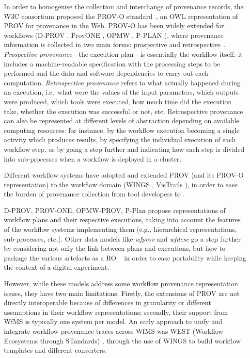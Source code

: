 In order to homogenise the collection and interchange of provenance records, the W3C consortium proposed the PROV-O standard~\cite{Lebo 2013a}, an OWL \cite{W3C 2012} representation of PROV for provenance in the Web.
PROV-O has been widely extended for workflows (D-PROV \cite{Missier 2013}, ProvONE \cite{Cuevas-Vicenttín 2016}, OPMW \cite{Garijo 2011}, P-PLAN \cite{Garijo 2012}), where provenance information is collected in two main forms: prospective and retrospective~\cite{Freire 2008}. \emph{Prospective provenance}---the execution plan---is essentially the workflow itself: it includes a machine-readable specification with the processing steps to be performed and the data and software dependencies to carry out each computation.
\emph{Retrospective provenance} refers to what actually happened during an execution, i.e.~what were the values of the input parameters, which outputs were produced, which tools were executed, how much time did the execution take, whether the execution was successful or not, etc.
Retrospective provenance can also be represented at different levels of abstraction depending on available computing resources: for instance, by the workflow execution becoming a single activity which produces results, by specifying the individual execution of each workflow step, or by going a step further and indicating how each step is divided into sub-processes when a workflow is deployed in a cluster.

Different workflow systems have adopted and extended PROV (and its PROV-O representation) to the workflow domain (WINGS \cite{Gil 2011,Garijo 2014b}, VisTrails \cite{Scheidegger 2008,Costa 2013}), in order to ease the burden of provenance collection from tool developers to 
\cite{Atkinson 2017,Pérez 2018}.

D-PROV, PROV-ONE, OPMW-PROV, P-Plan propose representations of workflow plans and their respective executions, taking into account the features of the workflow systems implementing them (e.g., hierarchical representations, sub-processes, etc.).
Other data models like \emph{wfprov} and \emph{wfdesc}
\cite{Belhajjame 2015} go a step further by considering not only the link between plans and executions, but how to package the various artefacts as a 
\acrlong{RO}
~\cite{Bechhofer 2013} in order to ease portability while keeping the context of a digital experiment.

However, while these models address some workflow provenance representation issues, they have two main limitations: Firstly, the extensions of PROV are not directly interoperable because of differences in granularity or different assumptions in their workflow representations; secondly, their support from WfMS is typically one system per model.  An early approach to unify and integrate workflow provenance traces across WfMS was WEST (Workflow Ecosystems through STandards) \cite{Garijo 2014b}, through the use of WINGS \cite{Gil 2011} to build workflow templates and different converters. 


